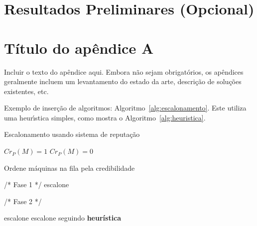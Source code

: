 \documentclass[a4paper,titlepage,12pt]{article}
\begin{document}
\section{Resultados Preliminares (Opcional)}

\newpage




\newpage


\appendix
\section{Título do apêndice A}
\label{ape:apeA}

Incluir o texto do apêndice aqui. Embora não sejam obrigatórios, os apêndices geralmente incluem um levantamento do estado da arte, descrição de soluções existentes, etc.

Exemplo de inserção de algoritmos: Algoritmo~\ref{alg:escalonamento}. Este utiliza uma heur\'{\i}stica
simples, como mostra o Algoritmo~\ref{alg:heuristica}.


\begin{algorithm}
\caption{Escalonamento usando sistema de reputação}
\label{alg:escalonamento}
\small
\begin{algorithmic}

 \STATE $Cr_{P}(M) = 1$ \ELSE \STATE
$Cr_{P}(M) = 0$ \ENDIF

\STATE Ordene máquinas na fila pela credibilidade

\STATE /* Fase 1 */ 
    \STATE escalone
\ENDWHILE

\STATE /* Fase 2 */ 

        \STATE escalone
    \ELSE
        \STATE escalone seguindo \textbf{heurística}
    \ENDIF

\ENDWHILE

\end {algorithmic}
\end {algorithm}
\end{document}
